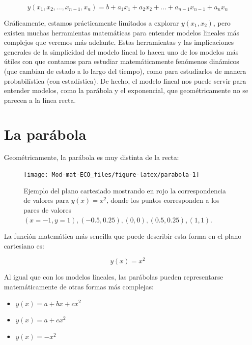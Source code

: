 \documentclass[
]{book}
\providecommand{\tightlist}{%
  \setlength{\itemsep}{0pt}\setlength{\parskip}{0pt}}
\begin{document}
\begin{equation}
y(x_1, x_2, \dots, x_{n-1}, x_n) = b + a_1 x_1 + a_2 x_2 + \dots + a_{n-1} x_{n-1} + a_n x_n
\end{equation}

Gráficamente, estamos prácticamente limitados a explorar \(y(x_1, x_2)\), pero existen muchas herramientas matemáticas para entender modelos lineales más complejos que veremos más adelante. Estas herramientas y las implicaciones generales de la simplicidad del modelo lineal lo hacen uno de los modelos más útiles con que contamos para estudiar matemáticamente fenómenos dinámicos (que cambian de estado a lo largo del tiempo), como para estudiarlos de manera probabilística (con estadística). De hecho, el modelo lineal nos puede servir para entender modelos, como la parábola y el exponencial, que geométricamente no se parecen a la línea recta.

\hypertarget{la-paruxe1bola}{%
\section{La parábola}\label{la-paruxe1bola}}

Geométricamente, la parábola es muy distinta de la recta:

\begin{figure}

{\centering \texttt{[image: Mod-mat-ECO\_files/figure-latex/parabola-1]} 

}

\caption{Ejemplo del plano cartesiado mostrando en rojo la correspondencia de valores para $y(x) = x^2$, donde los puntos corresponden a los pares de valores $(x = -1, y = 1), (-0.5, 0.25), (0, 0), (0.5, 0.25), (1, 1)$.}\label{fig:parabola}
\end{figure}

La función matemática más sencilla que puede describir esta forma en el plano cartesiano es:

\begin{equation}
    y(x) = x^2
\end{equation}

Al igual que con los modelos lineales, las parábolas pueden representarse matemáticamente de otras formas más complejas:

\begin{itemize}
\tightlist
\item
  \(y(x) = a + bx + cx^2\)
\item
  \(y(x) = a + cx^2\)
\item
  \(y(x) = -x^2\)
\end{itemize}
\end{document}

